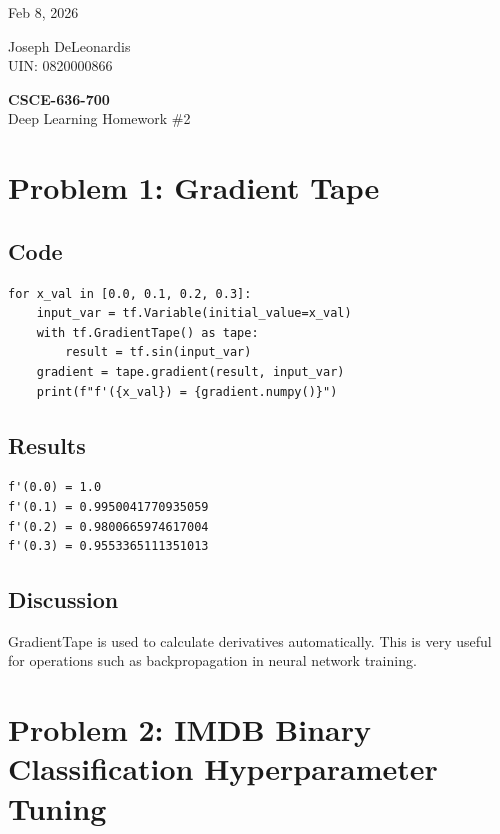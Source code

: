 \documentclass{article}
\begin{document}
\noindent
\begin{minipage}[t]{0.5\textwidth}
    \raggedright
    Feb 8, 2026
\end{minipage}%
\begin{minipage}[t]{0.5\textwidth}
    \raggedleft
    Joseph DeLeonardis\\
    UIN: 0820000866
\end{minipage}
\vspace{0.5cm}
\begin{center}
    \textbf{\Large CSCE-636-700}\\
    Deep Learning Homework \#2
\end{center}
\vspace{1cm}

\section*{Problem 1: Gradient Tape}

\subsection*{Code}
\begin{verbatim}
for x_val in [0.0, 0.1, 0.2, 0.3]:
    input_var = tf.Variable(initial_value=x_val)
    with tf.GradientTape() as tape:
        result = tf.sin(input_var)
    gradient = tape.gradient(result, input_var)
    print(f"f'({x_val}) = {gradient.numpy()}")
\end{verbatim}

\subsection*{Results}
\begin{verbatim}
f'(0.0) = 1.0
f'(0.1) = 0.9950041770935059
f'(0.2) = 0.9800665974617004
f'(0.3) = 0.9553365111351013
\end{verbatim}

\subsection*{Discussion}
GradientTape is used to calculate derivatives automatically. This is very useful for operations such as backpropagation in neural network training.

\section*{Problem 2: IMDB Binary Classification Hyperparameter Tuning}
\end{document}
